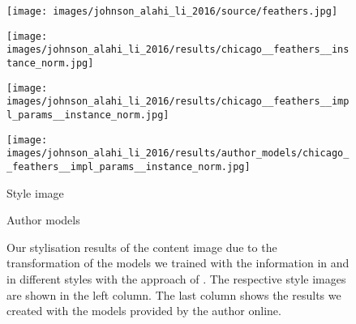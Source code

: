 \begin{figure}[H]
    \hfill%
    \begin{minipage}[t]{0.24\textwidth}
    	\centering
    	\texttt{[image: images/johnson\_alahi\_li\_2016/source/feathers.jpg]}
    \end{minipage}
    \hfill%
    \begin{minipage}[t]{0.24\textwidth}
    	\centering
    	\texttt{[image: images/johnson\_alahi\_li\_2016/results/chicago\_\_feathers\_\_instance\_norm.jpg]}
    \end{minipage}
    \hfill%
    \begin{minipage}[t]{0.24\textwidth}
    	\centering
    	\texttt{[image: images/johnson\_alahi\_li\_2016/results/chicago\_\_feathers\_\_impl\_params\_\_instance\_norm.jpg]}
    \end{minipage}
    \hfill%
    \begin{minipage}[t]{0.24\textwidth}
    	\centering
    	\texttt{[image: images/johnson\_alahi\_li\_2016/results/author\_models/chicago\_\_feathers\_\_impl\_params\_\_instance\_norm.jpg]}
    \end{minipage}
	\hfill%
	\begin{minipage}[t]{0.24\textwidth}
		\centering
		Style image
	\end{minipage}
	\hfill%
	\begin{minipage}[t]{0.24\textwidth}
		\centering
		\paper{}
	\end{minipage}
	\hfill%
	\begin{minipage}[t]{0.24\textwidth}
		\centering
		\implementation{}
	\end{minipage}
	\hfill%
	\begin{minipage}[t]{0.24\textwidth}
		\centering
		Author models
	\end{minipage}
	\caption{Our stylisation results of the content image due to the transformation of the models we trained with the information in \paper{} and \implementation{} in different styles with the approach of  \cite{JAL2016}. The respective style images are shown in the left column. The last column shows the results we created with the models provided by the author online.}
	\label{fig:johnson_alahi_li_2016_fig}
\end{figure}

